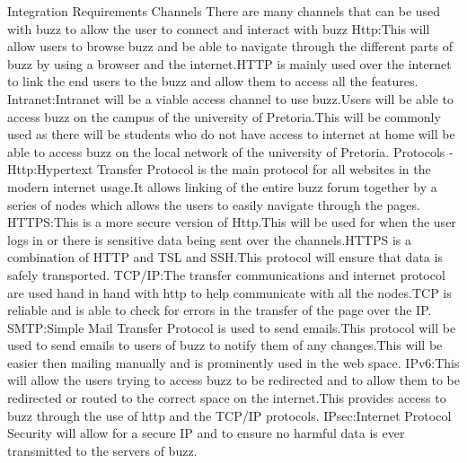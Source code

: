  Integration Requirements
Channels
There are many channels that can be used  with buzz to allow the user to connect and interact with buzz
Http:This will allow users to browse buzz and be able to navigate through the different parts of buzz by using a browser and the internet.HTTP is mainly used over the internet to link the end users to the buzz and allow them to access all the features.
Intranet:Intranet will be a viable access channel to use buzz.Users will be able to access buzz on the campus of the university of Pretoria.This will be commonly used as there will be students who do not have access to internet at home will be able to access buzz on the local network of the university of Pretoria.
Protocols
-Http:Hypertext Transfer Protocol is the main protocol for all websites in the modern internet usage.It allows linking of the entire buzz forum together by a series of nodes which allows the users to easily navigate through the pages.
HTTPS:This is a more secure version of Http.This will be used for when the user logs in or there is sensitive data being sent over the channels.HTTPS is a combination of HTTP and TSL and SSH.This protocol will ensure that data is safely transported.
TCP/IP:The transfer communications and internet protocol are used hand in hand with http to help communicate with all the nodes.TCP is reliable and is able to check for errors in the transfer of the page over the IP.
SMTP:Simple Mail Transfer Protocol is used to send emails.This protocol will be used to send emails to users of buzz to notify them of any changes.This will be easier then mailing manually and is prominently used in the web space.
IPv6:This will allow the users trying to  access buzz to be redirected and to allow them to be redirected or routed to the correct space on the internet.This provides access to buzz through the use of http and the TCP/IP protocols.
IPsec:Internet Protocol Security will allow for a secure IP and to ensure no harmful data is ever transmitted to the servers of buzz.
